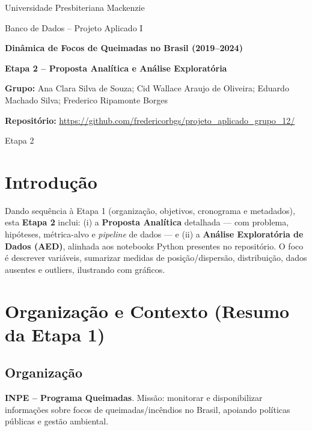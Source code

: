 \documentclass[12pt,a4paper]{report}
\newcommand{\titulo}{Dinâmica de Focos de Queimadas no Brasil (2019--2024)}
\newcommand{\curso}{Banco de Dados -- Projeto Aplicado I}
\newcommand{\instituicao}{Universidade Presbiteriana Mackenzie}
\newcommand{\grupo}{Ana Clara Silva de Souza; Cid Wallace Araujo de Oliveira; Eduardo Machado Silva; Frederico Ripamonte Borges}
\newcommand{\repositorio}{\url{https://github.com/fredericorbgs/projeto_aplicado_grupo_12/}}
\newcommand{\dataentrega}{Etapa 2}
\begin{document}
\hypersetup{pageanchor=false}
\begin{titlepage}
  \centering
  {\Large \instituicao\par}
  \vspace{1.5cm}
  {\large \curso\par}
  \vspace{3cm}
  {\LARGE\bfseries \titulo\par}
  \vspace{2cm}
  {\large \textbf{Etapa 2 -- Proposta Analítica e Análise Exploratória}\par}
  \vspace{2cm}
  {\large \textbf{Grupo:} \grupo\par}
  \vfill
  {\large \textbf{Repositório:} \repositorio\par}
  \vspace{1cm}
  {\large \dataentrega\par}
\end{titlepage}
\hypersetup{pageanchor=true}

\tableofcontents
\listoffigures
\listoftables
\cleardoublepage
{}

\chapter*{Introdução}

Dando sequência à Etapa 1 (organização, objetivos, cronograma e metadados), esta \textbf{Etapa 2} inclui: (i) a \textbf{Proposta Analítica} detalhada --- com problema, hipóteses, métrica-alvo e \textit{pipeline} de dados --- e (ii) a \textbf{Análise Exploratória de Dados (AED)}, alinhada aos notebooks Python presentes no repositório. O foco é descrever variáveis, sumarizar medidas de posição/dispersão, distribuição, dados ausentes e outliers, ilustrando com gráficos.

\chapter{Organização e Contexto (Resumo da Etapa 1)}

\section{Organização}
\textbf{INPE -- Programa Queimadas}. Missão: monitorar e disponibilizar informações sobre focos de queimadas/incêndios no Brasil, apoiando políticas públicas e gestão ambiental.
\end{document}
